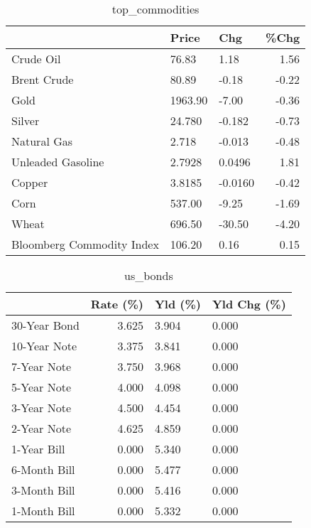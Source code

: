 \documentclass{article}%
\begin{document}
\begin{table}[htbp]%
\caption{top\_commodities}%
\centering%
\begin{adjustbox}{width=1\textwidth}%
\begin{tabular}{lllr}
\toprule
                          &   Price &     Chg &  \%Chg \\
\midrule
               Crude Oil  &   76.83 &    1.18 &  1.56 \\
             Brent Crude  &   80.89 &   -0.18 & -0.22 \\
                    Gold  & 1963.90 &   -7.00 & -0.36 \\
                  Silver  &  24.780 &  -0.182 & -0.73 \\
             Natural Gas  &   2.718 &  -0.013 & -0.48 \\
       Unleaded Gasoline  &  2.7928 &  0.0496 &  1.81 \\
                  Copper  &  3.8185 & -0.0160 & -0.42 \\
                    Corn  &  537.00 &   -9.25 & -1.69 \\
                   Wheat  &  696.50 &  -30.50 & -4.20 \\
Bloomberg Commodity Index &  106.20 &    0.16 &  0.15 \\
\bottomrule
\end{tabular}
%
\end{adjustbox}%
\end{table}

%


\begin{table}[htbp]%
\caption{us\_bonds}%
\centering%
\begin{adjustbox}{width=1\textwidth}%
\begin{tabular}{lrll}
\toprule
             &  Rate (\%) & Yld (\%) & Yld Chg (\%) \\
\midrule
30-Year Bond &     3.625 &   3.904 &       0.000 \\
10-Year Note &     3.375 &   3.841 &       0.000 \\
 7-Year Note &     3.750 &   3.968 &       0.000 \\
 5-Year Note &     4.000 &   4.098 &       0.000 \\
 3-Year Note &     4.500 &   4.454 &       0.000 \\
 2-Year Note &     4.625 &   4.859 &       0.000 \\
 1-Year Bill &     0.000 &   5.340 &       0.000 \\
6-Month Bill &     0.000 &   5.477 &       0.000 \\
3-Month Bill &     0.000 &   5.416 &       0.000 \\
1-Month Bill &     0.000 &   5.332 &       0.000 \\
\bottomrule
\end{tabular}
%
\end{adjustbox}%
\end{table}
\end{document}
